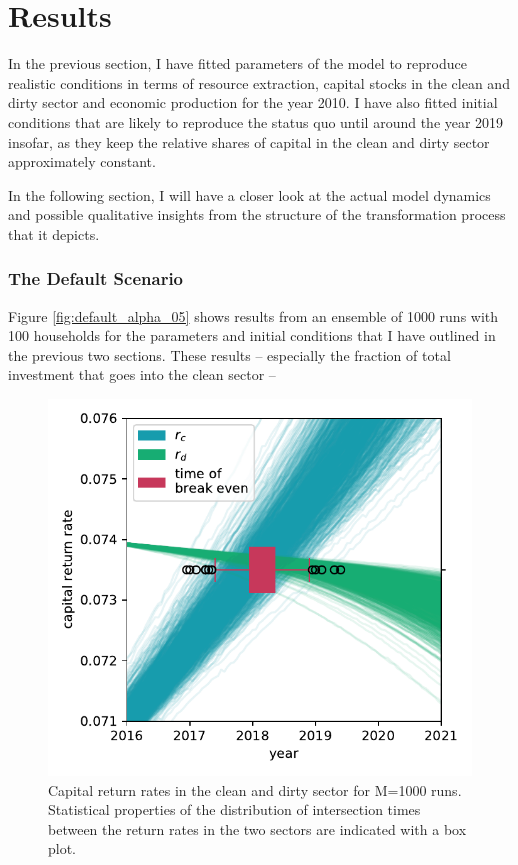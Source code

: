 \newpage






\cleardoublepage
\section{Results}  
In the previous section, I have fitted parameters of the model to reproduce realistic conditions in terms of resource extraction, capital stocks in the clean and dirty sector and economic production for the year 2010. I have also fitted initial conditions that are likely to reproduce the status quo until around the year 2019 insofar, as they keep the relative shares of capital in the clean and dirty sector approximately constant. 

In the following section, I will have a closer look at the actual model dynamics and possible qualitative insights from the structure of the transformation process that it depicts.

\subsubsection{The Default Scenario}
Figure \ref{fig:default_alpha_05} shows results from an ensemble of 1000 runs with 100 households for the parameters and initial conditions that I have outlined in the previous two sections. These results -- especially the fraction of total investment that goes into the clean sector -- 
\begin{figure}
	\vspace{-.1 cm}
        \hspace{-1.8 cm}
        \includegraphics[width = .64 \textwidth]{./figures/break_even.pdf}
        \caption{Capital return rates in the clean and dirty sector for M=1000 runs. Statistical properties of the distribution of intersection times between the return rates in the two sectors are indicated with a box plot.\label{fig:break_even}}
\end{figure}


